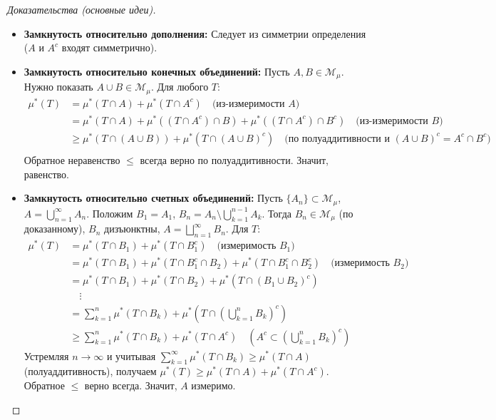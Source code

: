 \documentclass[a4paper, 12pt]{article}
\newcommand{\1}{\mathbf{1}}
\begin{document}
\begin{proof}[Доказательства (основные идеи)]
    \hfill
    \begin{itemize}
        \item \textbf{Замкнутость относительно дополнения:} Следует из симметрии определения ($A$ и $A^c$ входят симметрично).
        \item \textbf{Замкнутость относительно конечных объединений:} Пусть $A, B \in \mathcal{M}_{\mu}$. Нужно показать $A \cup B \in \mathcal{M}_{\mu}$. Для любого $T$:
        \begin{align*}
        \mu^*(T) &= \mu^*(T \cap A) + \mu^*(T \cap A^c) \quad \text{(из-измеримости } A) \\
        &= \mu^*(T \cap A) + \mu^*((T \cap A^c) \cap B) + \mu^*((T \cap A^c) \cap B^c) \quad \text{(из-измеримости } B) \\
        &\geq \mu^*(T \cap (A \cup B)) + \mu^*(T \cap (A \cup B)^c) \quad \text{(по полуаддитивности и } (A \cup B)^c = A^c \cap B^c) \\
        \end{align*}
        Обратное неравенство $\leq$ всегда верно по полуаддитивности. Значит, равенство.
        \item \textbf{Замкнутость относительно счетных объединений:} Пусть $\{A_n\} \subset \mathcal{M}_{\mu}$, $A = \bigcup_{n=1}^{\infty} A_n$. Положим $B_1 = A_1$, $B_n = A_n \setminus \bigcup_{k=1}^{n-1} A_k$. Тогда $B_n \in \mathcal{M}_{\mu}$ (по доказанному), $B_n$ дизъюнктны, $A = \bigsqcup_{n=1}^{\infty} B_n$. Для $T$:
        \begin{align*}
        \mu^*(T) &= \mu^*(T \cap B_1) + \mu^*(T \cap B_1^c) \quad \text{(измеримость } B_1) \\
        &= \mu^*(T \cap B_1) + \mu^*(T \cap B_1^c \cap B_2) + \mu^*(T \cap B_1^c \cap B_2^c) \quad \text{(измеримость } B_2) \\
        &= \mu^*(T \cap B_1) + \mu^*(T \cap B_2) + \mu^*(T \cap (B_1 \cup B_2)^c) \\
        &\quad \vdots \\
        &= \sum_{k=1}^n \mu^*(T \cap B_k) + \mu^*(T \cap (\bigcup_{k=1}^n B_k)^c) \\
        &\geq \sum_{k=1}^n \mu^*(T \cap B_k) + \mu^*(T \cap A^c) \quad (A^c \subset (\bigcup_{k=1}^n B_k)^c)
        \end{align*}
        Устремляя $n \to \infty$ и учитывая $\sum_{k=1}^{\infty} \mu^*(T \cap B_k) \geq \mu^*(T \cap A)$ (полуаддитивность), получаем $\mu^*(T) \geq \mu^*(T \cap A) + \mu^*(T \cap A^c)$. Обратное $\leq$ верно всегда. Значит, $A$ измеримо.

\end{itemize}
\end{proof}
\end{document}
